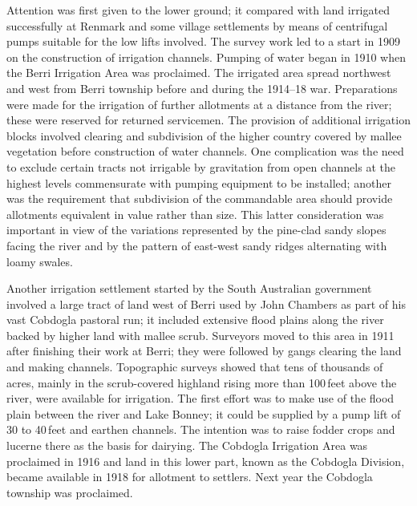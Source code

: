 Attention was first given to the lower ground; it compared with land
irrigated successfully at Renmark and some village settlements by
means of centrifugal pumps suitable for the low lifts involved.  The
survey work led to a start in 1909 on the construction of irrigation
channels.  Pumping of water began in 1910 when the Berri Irrigation
Area was proclaimed.  The irrigated area
spread northwest and west from Berri township before and during the
1914--18 war. Preparations were made for the irrigation of further
allotments at a distance from the river; these were reserved for
returned servicemen.  The provision of additional irrigation blocks
involved clearing and subdivision of the higher country covered by
mallee vegetation before construction of water channels.  One
complication was the need to exclude certain tracts not irrigable by
gravitation from open channels at the highest levels commensurate with
pumping equipment to be installed; another was the requirement that
subdivision of the commandable area should provide allotments
equivalent in value rather than size.  This latter consideration was
important in view of the variations represented by the pine-clad sandy
slopes facing the river and by the pattern of east-west sandy ridges
alternating with loamy swales.

Another irrigation settlement started by the South Australian
government involved a large tract of land west of Berri used by John
Chambers  as part of his vast Cobdogla
 pastoral run; it included extensive flood plains
along the river backed by higher land with mallee scrub.  Surveyors
moved to this area in 1911 after finishing their work at Berri; they
were followed by gangs clearing the land and making channels.
Topographic surveys showed that tens of thousands of acres, mainly in
the scrub-covered highland rising more than 100\,feet above the river,
were available for irrigation.  The first effort was to make use of
the flood plain between the river and Lake Bonney; it could be
supplied by a pump lift of 30 to 40\,feet and earthen channels. The
intention was to raise fodder crops and lucerne there as the basis for
dairying.  The Cobdogla Irrigation Area  was proclaimed in 1916 and land in this lower part,
known as the Cobdogla Division, became available in 1918 for allotment
to settlers. Next year the Cobdogla township was
proclaimed.

